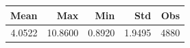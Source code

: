 \begin{tabular}{rrrrr}
\toprule
Mean & Max & Min & Std & Obs \\
\midrule
4.0522 & 10.8600 & 0.8920 & 1.9495 & 4880 \\
\bottomrule
\end{tabular}
